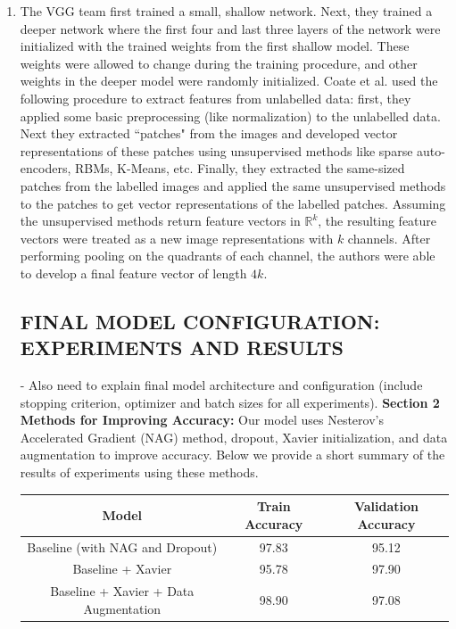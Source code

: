 \documentclass[a4paper]{article}
\begin{document}
\begin{enumerate}
{}
\item{ The VGG team first trained a small, shallow network. Next, they trained a deeper network where the first four and last three layers of the network were initialized with the trained weights from the first shallow model. These weights were allowed to change during the training procedure, and other weights in the deeper model were randomly initialized. 
\newline
\newline 
Coate et al. used the following procedure to extract features from unlabelled data: first, they applied some basic preprocessing (like normalization) to the unlabelled data. Next they extracted ``patches" from the images and developed vector representations of these patches using unsupervised methods like sparse auto-encoders, RBMs, K-Means, etc. Finally, they extracted the same-sized patches from the labelled images and applied the same unsupervised methods to the patches to get vector representations of the labelled patches. Assuming the unsupervised methods return feature vectors in $\mathbb{R}^k$, the resulting feature vectors were treated as a new image representations with $k$ channels. After performing pooling on the quadrants of each channel, the authors were able to develop a final feature vector of length $4k$. 

\subsection*{FINAL MODEL CONFIGURATION: EXPERIMENTS AND RESULTS}
- Also need to explain final model architecture and configuration (include stopping criterion, optimizer and batch sizes for all experiments).
\newline
\newline
\textbf{Section 2 Methods for Improving Accuracy:}
\newline
\newline
Our model uses Nesterov's Accelerated Gradient (NAG) method, dropout, Xavier initialization, and data augmentation to improve accuracy. Below we provide a short summary of the results of experiments using these methods. 

\begin{center}
\begin{tabular}{ |c|c|c| } 
 \hline
 Model & Train Accuracy & Validation Accuracy \\ \hline
 Baseline (with NAG and Dropout) & 97.83 & 95.12 \\ 
 Baseline + Xavier & 95.78 & 97.90 \\ 
 Baseline + Xavier + Data Augmentation & 98.90 & 97.08 \\ 
 \hline
\end{tabular}
\end{center}

}
\end{enumerate}
\end{document}
